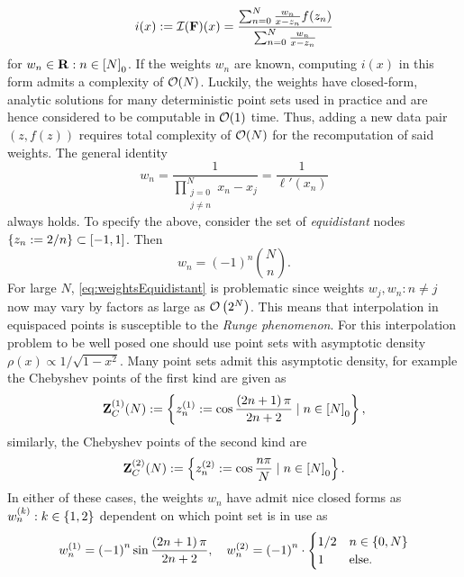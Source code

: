 \documentclass[12pt, oneside]{amsart}
\theoremstyle{definition}
\theoremstyle{remark}
\numberwithin{equation}{section}
\begin{document}
\begin{equation}\label{eq:barycentricLagrange}
    i(x) := \mathcal{I}(\mathbf{F})(x) = \frac{\sum_{n=0}^N \frac{w_n}{x-z_n} f(z_n)}{\sum_{n=0}^N \frac{w_n}{x-z_n}}
\end{equation}
for \(w_n \in \mathbf{R} : n \in {[N]}_0\). If the weights \(w_n\) are known, computing \(i(x)\) in this form admits a complexity of \(\mathcal{O}(N)\). Luckily, the weights have closed-form, analytic solutions for many deterministic point sets used in practice and are hence considered to be computable in \(\mathcal{O}(1)\) time. Thus, adding a new data pair \((z, f(z))\) requires total complexity of \(\mathcal{O}(N)\) for the recomputation of said weights. The general identity \[
    w_n = \frac{1}{\prod_{\substack{j=0\\j \neq n}}^N x_n - x_j} = \frac{1}{\ell'(x_n)}
\]
always holds. To specify the above, consider the set of \emph{equidistant} nodes \(\left\{z_n := 2/n\right\} \subset [-1, 1]\). Then \begin{equation}\label{eq:weightsEquidistant}
    w_n = {\left(-1\right)}^n {N \choose n}.
\end{equation}
For large \(N\), \cref{eq:weightsEquidistant} is problematic since weights \(w_j, w_n: n \neq j\) now may vary by factors as large as \(\mathcal{O}\left(2^N\right)\). This means that interpolation in equispaced points is susceptible to the \emph{Runge phenomenon}. For this interpolation problem to be well posed one should use point sets with asymptotic density \(\rho(x) \propto 1/\sqrt{1-x^2}\). Many point sets admit this asymptotic density, for example the Chebyshev points of the first kind are given as
\begin{equation}\label{eq:chebyPts1}
    \mathbf{Z}_C^{(1)}(N) := \left\{z^{(1)}_n := \cos \frac{\left(2n+1\right) \pi}{2n+2} \mid n \in {[N]}_0\right\},
\end{equation}
similarly, the Chebyshev points of the second kind are
\begin{equation}\label{eq:chebyPts2}
    \mathbf{Z}_C^{(2)}(N) := \left\{z^{(2)}_n := \cos \frac{n\pi}{N} \mid n \in {[N]}_0\right\}.
\end{equation}
In either of these cases, the weights \(w_n\) have admit nice closed forms as \(w_n^{(k)}: k \in \left\{1,2\right\}\) dependent on which point set is in use as
\begin{equation}\label{eq:weightsChebyshev}
    w_n^{(1)} = {\left(-1\right)}^n \sin \frac{\left(2n+1\right) \pi}{2n+2}, \quad w_n^{(2)} = {\left(-1\right)}^n \cdot \begin{cases}
        1/2 &n \in \left\{0, N\right\}\\
        1 &\text{else.}
    \end{cases}
\end{equation}
\end{document}
